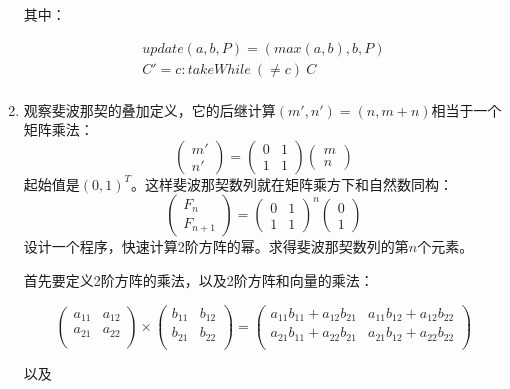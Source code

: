 \documentclass[UTF8]{article}
\begin{document}
\begin{enumerate}
其中：

\[ \begin{array}{l}
update(a, b, P) = (max(a, b), b, P) \\
C' = c : takeWhile\ (\neq c)\ C \\
\end{array} \]

\item 观察斐波那契的叠加定义，它的后继计算$(m', n') = (n, m + n)$相当于一个矩阵乘法：
\[
\begin{pmatrix} m' \\ n' \end{pmatrix} =
\begin{pmatrix} 0 & 1 \\ 1 & 1 \end{pmatrix}
\begin{pmatrix} m \\ n \end{pmatrix}
\]
起始值是$(0, 1)^T$。这样斐波那契数列就在矩阵乘方下和自然数同构：
\[
\begin{pmatrix}F_n \\ F_{n+1} \end{pmatrix} = \begin{pmatrix} 0 & 1 \\ 1 & 1 \end{pmatrix}^n\begin{pmatrix} 0 \\ 1 \end{pmatrix}
\]
设计一个程序，快速计算2阶方阵的幂。求得斐波那契数列的第$n$个元素。

首先要定义2阶方阵的乘法，以及2阶方阵和向量的乘法：

\[
\begin{pmatrix}
a_{11} & a_{12} \\
a_{21} & a_{22} \\
\end{pmatrix}
\times
\begin{pmatrix}
b_{11} & b_{12} \\
b_{21} & b_{22} \\
\end{pmatrix}
=
\begin{pmatrix}
a_{11} b_{11} + a_{12} b_{21} & a_{11} b_{12} + a_{12} b_{22} \\
a_{21} b_{11} + a_{22} b_{21} & a_{21} b_{12} + a_{22} b_{22} \\
\end{pmatrix}
\]

以及


\end{enumerate}
\end{document}
